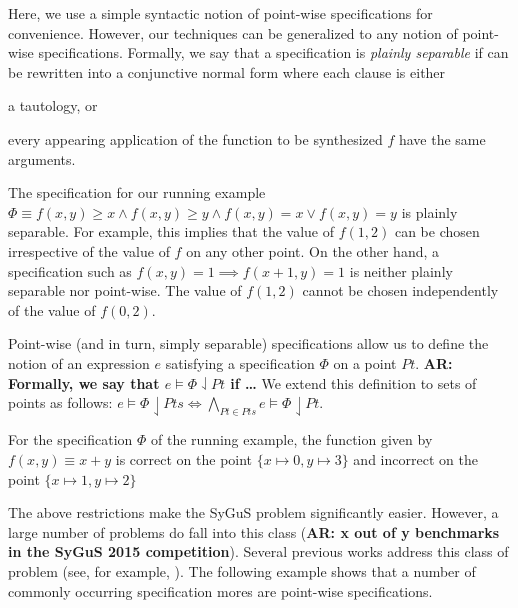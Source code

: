 \documentclass{llncs}
\newcommand\arsays[1]{{\bf AR: #1}}
\newcommand\Points{\mathit{Pts}}
\newcommand\Point{\mathit{Pt}}
\newcommand\Expr{e}
\newcommand\Spec{\Phi}
\newcommand\SynthFun{f}
\begin{document}
Here, we use a simple syntactic notion of point-wise specifications for
convenience.
However, our techniques can be generalized to any notion of point-wise
specifications.
Formally, we say that a specification is {\em plainly separable} if can
be rewritten into a conjunctive normal form where each clause is either
\begin{inparaenum}[(a)]
\item a tautology, or
\item every appearing application of the function to be synthesized
  $\SynthFun$ have the same arguments.
\end{inparaenum}

\begin{example}
  The specification for our running example $\Spec \equiv \SynthFun(x,
  y) \geq x \wedge \SynthFun(x, y) \geq y \wedge \SynthFun(x, y) = x
  \vee \SynthFun(x, y) = y$ is plainly separable.
  For example, this implies that the value of $\SynthFun(1, 2)$ can be
  chosen irrespective of the value of $\SynthFun$ on any other point.
  On the other hand, a specification such as $\SynthFun(x, y) = 1
  \implies \SynthFun(x + 1, y) = 1$ is neither plainly separable nor
  point-wise.
  The value of $\SynthFun(1, 2)$ cannot be chosen independently of the
  value of $\SynthFun(0, 2)$.
\end{example}

Point-wise (and in turn, simply separable) specifications allow us to
define the notion of an expression $\Expr$ satisfying a specification
$\Spec$ on a point $\Point$.
\arsays{Formally, we say that $\Expr \models \Spec \downharpoonleft
\Point$ if \dots}
We extend this definition to sets of points as follows: $\Expr \models
\Spec \downharpoonleft \Points \Leftrightarrow \bigwedge_{\Point \in
\Points} \Expr \models \Spec\downharpoonleft\Point$.

\begin{example}
  \label{ex:running:correctness_on_point}
  For the specification $\Spec$ of the running example, the function
  given by $\SynthFun(x, y) \equiv x + y$ is correct on the point $\{ x
      \mapsto 0, y \mapsto 3 \}$ and incorrect on the point $\{ x
  \mapsto 1, y \mapsto 2 \}$
\end{example}

The above restrictions make the SyGuS problem significantly easier.
However, a large number of problems do fall into this class (\arsays{x
out of y benchmarks in the SyGuS 2015 competition}).
Several previous works address this class of problem (see, for
example, \cite{ACR15,Madhu,xxx}).
The following example shows that a number of commonly occurring
specification mores are point-wise specifications.
\end{document}
